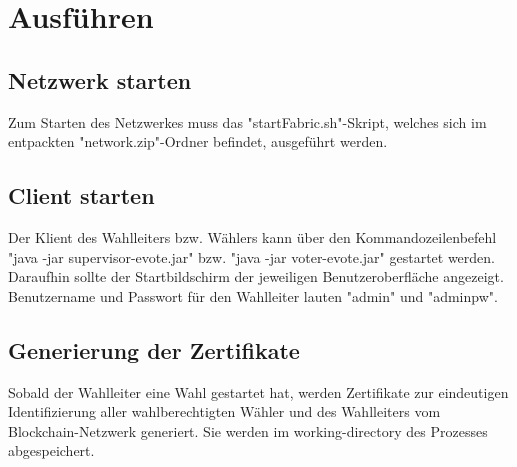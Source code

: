 \documentclass[parskip=full]{scrartcl}
\begin{document}
	\section{Ausführen}
	\subsection{Netzwerk starten}
	Zum Starten des Netzwerkes muss das "startFabric.sh"-Skript, welches sich im entpackten "network.zip"-Ordner befindet, ausgeführt werden.
	\subsection{Client starten}
	Der Klient des Wahlleiters bzw. Wählers kann über den Kommandozeilenbefehl "java -jar supervisor-evote.jar" bzw. "java -jar voter-evote.jar" gestartet werden. Daraufhin sollte der Startbildschirm der jeweiligen Benutzeroberfläche angezeigt. Benutzername und Passwort für den Wahlleiter lauten "admin" und "adminpw".

    \subsection{Generierung der Zertifikate}
    Sobald der Wahlleiter eine Wahl gestartet hat, werden Zertifikate zur eindeutigen Identifizierung aller wahlberechtigten Wähler und des Wahlleiters vom Blockchain-Netzwerk generiert. Sie werden im working-directory des Prozesses abgespeichert.
		
\end{document}
